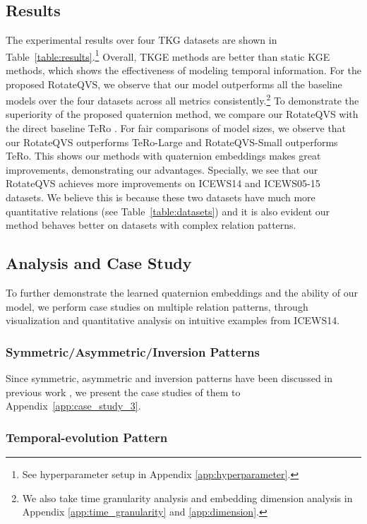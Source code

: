 \documentclass[11pt]{article}
\begin{document}
\subsection{Results}
The experimental results over four TKG datasets are shown in Table~\ref{table:results}.\footnote{See hyperparameter setup in Appendix \ref{app:hyperparameter}.}
Overall, TKGE methods are better than static KGE methods, which shows the effectiveness of modeling temporal information.
For the proposed RotateQVS, we observe that our model outperforms all the baseline models over the four datasets across all metrics consistently.\footnote{We also take time granularity analysis and embedding dimension analysis in Appendix \ref{app:time_granularity} and \ref{app:dimension}.}
To demonstrate the superiority of the proposed quaternion method, we compare our RotateQVS with the direct baseline TeRo \cite{xu2020tero}.
For fair comparisons of model sizes, we observe that our RotateQVS outperforms TeRo-Large and RotateQVS-Small outperforms TeRo.
This shows our methods with quaternion embeddings makes great improvements, demonstrating our advantages.
Specially, we see that our RotateQVS achieves more improvements on ICEWS14 and ICEWS05-15 datasets.
We believe this is because these two datasets have much more quantitative relations (see Table~\ref{table:datasets}) and it is also evident our method behaves better on datasets with complex relation patterns.


\subsection{Analysis and Case Study}
To further demonstrate the learned quaternion embeddings and the ability of our model, we perform case studies on multiple relation patterns, through visualization and quantitative analysis on intuitive examples from ICEWS14.

\subsubsection{Symmetric/Asymmetric/Inversion Patterns}
Since symmetric, asymmetric and inversion patterns have been discussed in previous work \cite{SunDNT19,xu2020tero}, we present the case studies of them to Appendix~\ref{app:case_study_3}.


\subsubsection{Temporal-evolution Pattern} \label{tempral_case}
\end{document}
